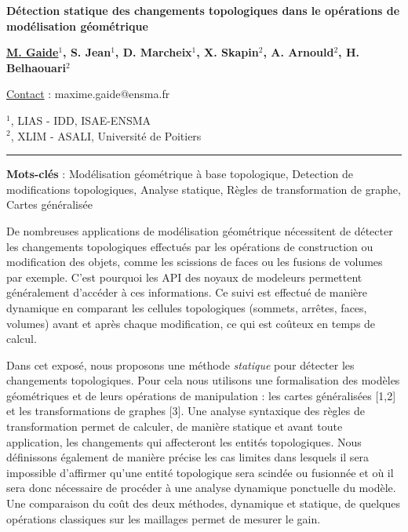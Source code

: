 \documentclass[11pt,a4paper]{article}
\begin{document}
\begin{center}
  {\Large \textbf{Détection statique des changements topologiques dans le opérations de modélisation géométrique}}
\end{center}

\setlength\parindent{0em}%
\textbf{\underline{M. Gaide}$^{1}$, S. Jean$^{1}$, D. Marcheix$^{1}$, X. Skapin$^{2}$, A. Arnould$^{2}$, H. Belhaouari$^{2}$}%

\begin{flushright}
  \underline{Contact} : maxime.gaide@ensma.fr
\end{flushright}

\begin{flushleft}
  \scriptsize{
    $^1$, LIAS - IDD, ISAE-ENSMA\\%
    $^2$, XLIM - ASALI, Université de Poitiers%
  }
\end{flushleft}

\rule{1\linewidth}{3pt}

\setlength\parindent{0em} \normalsize{ \textbf{Mots-clés} : Modélisation
  géométrique à base topologique, Detection de modifications topologiques,
  Analyse statique, Règles de transformation de graphe, Cartes généralisée}

\vspace*{1em}

\normalsize{
  De nombreuses applications de modélisation géométrique nécessitent de détecter
  les changements topologiques effectués par les opérations de construction ou
  modification des objets, comme les scissions de faces ou les fusions de
  volumes par exemple. C'est pourquoi les API des noyaux de modeleurs permettent
  généralement d'accéder à ces informations. Ce suivi est effectué de manière
  dynamique en comparant les cellules topologiques (sommets, arrêtes, faces,
  volumes) avant et après chaque modification, ce qui est coûteux en temps de
  calcul.

  Dans cet exposé, nous proposons une méthode \emph{statique} pour détecter les
  changements topologiques. Pour cela nous utilisons une formalisation des
  modèles géométriques et de leurs opérations de manipulation : les cartes
  généralisées [1,2] et les transformations de graphes [3].
  Une analyse syntaxique des règles de transformation permet de calculer, de
  manière statique et avant toute application, les changements qui affecteront
  les entités topologiques. Nous définissons également de manière précise les
  cas limites dans lesquels il sera impossible d'affirmer qu'une entité
  topologique sera scindée ou fusionnée et où il sera donc nécessaire de
  procéder à une analyse dynamique ponctuelle du modèle. Une comparaison du coût
  des deux méthodes, dynamique et statique, de quelques opérations classiques
  sur les maillages permet de mesurer le gain.}%
\end{document}
